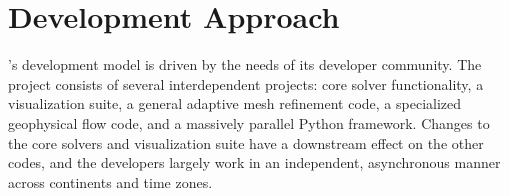 %
%
%

\section{Development Approach}

\clawpack's development model is driven by the needs of its
developer community.  The \clawpack project consists of several
interdependent projects: core solver functionality, a
visualization suite, a general adaptive mesh refinement code, a
specialized geophysical flow code, and a massively parallel Python
framework.  Changes to the core solvers and visualization suite have a
downstream effect on the other codes, and the developers largely work
in an independent, asynchronous manner across continents and time
zones.

